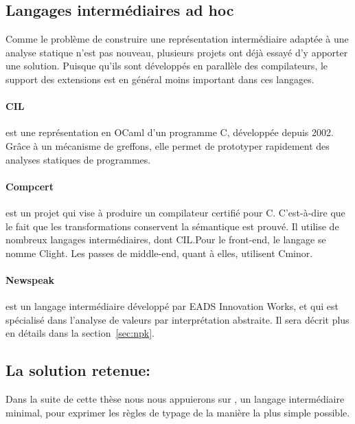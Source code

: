 \subsection*{Langages intermédiaires ad hoc}

Comme le problème de construire une représentation intermédiaire adaptée à une
analyse statique n'est pas nouveau, plusieurs projets ont déjà essayé d'y
apporter une solution. Puisque qu'ils sont développés en parallèle des
compilateurs, le support des extensions est en général moins important dans ces
langages.

\paragraph{CIL}\cite{NeculaCil}  est une représentation en
OCaml d'un programme C, développée depuis 2002. Grâce à un mécanisme de
greffons, elle permet de prototyper rapidement des analyses statiques de
programmes.

\paragraph{Compcert} est un projet qui vise à produire un compilateur certifié
pour C. C'est-à-dire que le fait que les transformations conservent la
sémantique est prouvé. Il utilise de nombreux langages intermédiaires, dont
CIL.\@ Pour le front-end, le langage se nomme Clight\cite{cfront}. Les passes de
middle-end, quant à elles, utilisent Cminor\cite{cminorSL}.

\paragraph{Newspeak}\cite{newspeak} est un langage intermédiaire développé par
EADS Innovation Works, et qui est spécialisé dans l'analyse de valeurs par
interprétation abstraite. Il sera décrit plus en détails dans la
section~\ref{sec:npk}.

\subsection*{La solution retenue: \langname{}}

Dans la suite de cette thèse nous nous appuierons sur \langname{}, un langage
intermédiaire minimal, pour exprimer les règles de typage de la manière la plus
simple possible.


